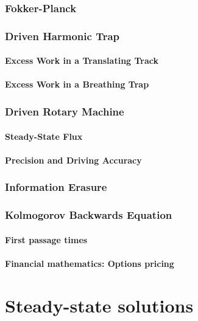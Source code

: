 \documentclass[15pt]{article}
\begin{document}
    \section{Fokker-Planck}


    \section{Driven Harmonic Trap}

    \subsection{Excess Work in a Translating Track}

    \subsection{Excess Work in a Breathing Trap}


    \section{Driven Rotary Machine}

    \subsection{Steady-State Flux}

    \subsection{Precision and Driving Accuracy}

    \section{Information Erasure}

    \section{Kolmogorov Backwards Equation}

    \subsection{First passage times}

    \subsection{Financial mathematics: Options pricing}


\part{Steady-state solutions}

\end{document}
